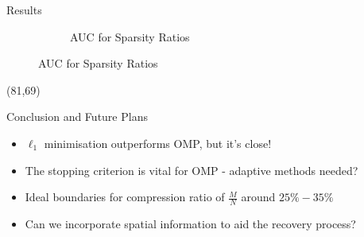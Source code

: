 \documentclass[final]{beamer}
\begin{document}
\begin{frame}{}
\begin{textblock}{36}
\begin{block}{Results}
\begin{figure}
\begin{subfigure}[b]{0.4\textwidth}
                \caption{AUC for  Sparsity Ratios}
        \end{subfigure}
\end{figure}
  \end{block}
\end{textblock}




\begin{textblock}{36}(81,69)
  \begin{block}{Conclusion and Future Plans}
   \begin{itemize}
  \item $\ell_1$ minimisation outperforms OMP, but it's close!
\item The stopping criterion is vital for OMP - adaptive methods needed?
\item Ideal boundaries for compression ratio of $\frac{M}{N}$ around $25 \% - 35 \%$ 
\item Can we incorporate spatial information to aid the recovery process?
  \end{itemize}
 \end{block}
\end{textblock}

\end{frame}
\end{document}
